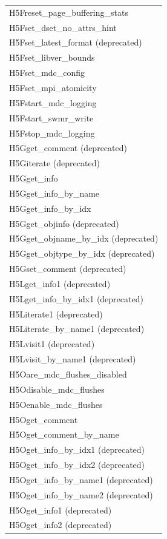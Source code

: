 \begin{longtable}{ |>{\raggedright\arraybackslash}p{\linewidth}| }
    H5Freset\_page\_buffering\_stats \\
    H5Fset\_dset\_no\_attrs\_hint \\
    H5Fset\_latest\_format (deprecated) \\
    H5Fset\_libver\_bounds \\
    H5Fset\_mdc\_config \\
    H5Fset\_mpi\_atomicity \\
    H5Fstart\_mdc\_logging \\
    H5Fstart\_swmr\_write \\
    H5Fstop\_mdc\_logging \\
    \hline
    H5Gget\_comment (deprecated) \\
    H5Giterate (deprecated) \\
    H5Gget\_info \\
    H5Gget\_info\_by\_name \\
    H5Gget\_info\_by\_idx \\
    H5Gget\_objinfo (deprecated) \\
    H5Gget\_objname\_by\_idx (deprecated) \\
    H5Gget\_objtype\_by\_idx (deprecated) \\
    H5Gset\_comment (deprecated) \\
    \hline
    H5Lget\_info1 (deprecated) \\
    H5Lget\_info\_by\_idx1 (deprecated) \\
    H5Literate1 (deprecated) \\
    H5Literate\_by\_name1 (deprecated) \\
    H5Lvisit1 (deprecated) \\
    H5Lvisit\_by\_name1 (deprecated) \\
    \hline
    H5Oare\_mdc\_flushes\_disabled \\
    H5Odisable\_mdc\_flushes \\
    H5Oenable\_mdc\_flushes \\
    H5Oget\_comment \\
    H5Oget\_comment\_by\_name \\
    H5Oget\_info\_by\_idx1 (deprecated) \\
    H5Oget\_info\_by\_idx2 (deprecated)\\
    H5Oget\_info\_by\_name1 (deprecated) \\
    H5Oget\_info\_by\_name2 (deprecated)\\
    H5Oget\_info1 (deprecated) \\
    H5Oget\_info2 (deprecated) \\

\end{longtable}
